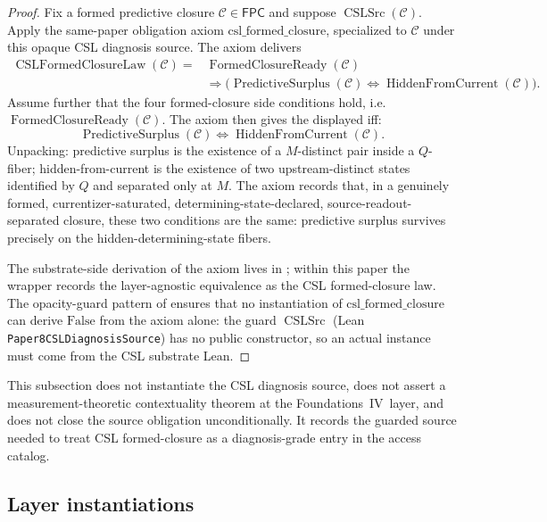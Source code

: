 \documentclass[11pt]{article}
\newcommand{\FIV}{Foundations~IV}
\newcommand{\currQ}{Q}                 \newcommand{\predM}{M}                 \newcommand{\splitObs}{\Delta}         \newcommand{\quotMap}{\pi}             \newcommand{\accessQ}{q_I}             \newcommand{\obsSig}{\sigma_I}         \newcommand{\closureForm}{\mathsf{cl}} \newcommand{\BirdInt}{\mathsf{BirdInt}}
\theoremstyle{definition}
\begin{document}
\begin{proof}
Fix a formed predictive closure \(\mathcal C\in\mathsf{FPC}\) and
suppose \(\operatorname{CSLSrc}(\mathcal C)\).  Apply the same-paper
obligation axiom \(\mathrm{csl\_formed\_closure}\), specialized to
\(\mathcal C\) under this opaque CSL diagnosis source.  The axiom
delivers
\begin{align*}
  \operatorname{CSLFormedClosureLaw}(\mathcal C)
  ={}&
  \operatorname{FormedClosureReady}(\mathcal C)\\
  &\Longrightarrow
  \bigl(
    \operatorname{PredictiveSurplus}(\mathcal C)
    \iff
    \operatorname{HiddenFromCurrent}(\mathcal C)
  \bigr).
\end{align*}
Assume further that the four formed-closure side conditions hold,
i.e.\ \(\operatorname{FormedClosureReady}(\mathcal C)\).  The axiom
then gives the displayed iff:
\[
  \operatorname{PredictiveSurplus}(\mathcal C)
  \iff
  \operatorname{HiddenFromCurrent}(\mathcal C).
\]
Unpacking: predictive surplus is the existence of a
\(\predM\)-distinct pair inside a \(\currQ\)-fiber;
hidden-from-current is the existence of two upstream-distinct states
identified by \(\currQ\) and separated only at \(\predM\).  The axiom
records that, in a genuinely formed, currentizer-saturated,
determining-state-declared, source-readout-separated closure, these
two conditions are the same: predictive surplus survives precisely on
the hidden-determining-state fibers.

The substrate-side derivation of the axiom lives in
\citep{Tsiokos2026CSL}; within this paper the wrapper records the
layer-agnostic equivalence as the CSL formed-closure law.  The
opacity-guard pattern of  ensures that no
instantiation of \(\mathrm{csl\_formed\_closure}\) can derive
\(\mathrm{False}\) from the axiom alone: the guard
\(\operatorname{CSLSrc}\) (Lean
\texttt{Paper8CSLDiagnosisSource}) has no public constructor, so an
actual instance must come from the CSL substrate Lean.
\end{proof}

This subsection does not instantiate the CSL diagnosis source, does
not assert a measurement-theoretic contextuality theorem at the
\FIV\ layer, and does not close the source obligation
unconditionally.  It records the guarded source needed to treat CSL
formed-closure as a diagnosis-grade entry in the access catalog.

\subsection*{Layer instantiations}\label{layer-inst:F13b}
\end{document}
